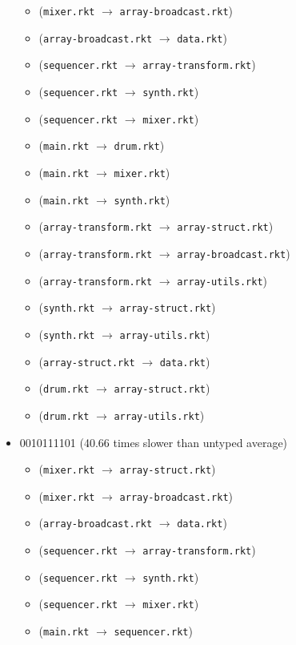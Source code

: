 \documentclass{article}
\newcommand{\mono}[1]{\texttt{#1}}
\begin{document}
\begin{itemize}
\begin{itemize}
  \item (\mono{mixer.rkt} $\rightarrow$ \mono{array-broadcast.rkt})
  \item (\mono{array-broadcast.rkt} $\rightarrow$ \mono{data.rkt})
  \item (\mono{sequencer.rkt} $\rightarrow$ \mono{array-transform.rkt})
  \item (\mono{sequencer.rkt} $\rightarrow$ \mono{synth.rkt})
  \item (\mono{sequencer.rkt} $\rightarrow$ \mono{mixer.rkt})
  \item (\mono{main.rkt} $\rightarrow$ \mono{drum.rkt})
  \item (\mono{main.rkt} $\rightarrow$ \mono{mixer.rkt})
  \item (\mono{main.rkt} $\rightarrow$ \mono{synth.rkt})
  \item (\mono{array-transform.rkt} $\rightarrow$ \mono{array-struct.rkt})
  \item (\mono{array-transform.rkt} $\rightarrow$ \mono{array-broadcast.rkt})
  \item (\mono{array-transform.rkt} $\rightarrow$ \mono{array-utils.rkt})
  \item (\mono{synth.rkt} $\rightarrow$ \mono{array-struct.rkt})
  \item (\mono{synth.rkt} $\rightarrow$ \mono{array-utils.rkt})
  \item (\mono{array-struct.rkt} $\rightarrow$ \mono{data.rkt})
  \item (\mono{drum.rkt} $\rightarrow$ \mono{array-struct.rkt})
  \item (\mono{drum.rkt} $\rightarrow$ \mono{array-utils.rkt})
  \end{itemize}
\item 0010111101 (40.66 times slower than untyped average)
  \begin{itemize}
  \item (\mono{mixer.rkt} $\rightarrow$ \mono{array-struct.rkt})
  \item (\mono{mixer.rkt} $\rightarrow$ \mono{array-broadcast.rkt})
  \item (\mono{array-broadcast.rkt} $\rightarrow$ \mono{data.rkt})
  \item (\mono{sequencer.rkt} $\rightarrow$ \mono{array-transform.rkt})
  \item (\mono{sequencer.rkt} $\rightarrow$ \mono{synth.rkt})
  \item (\mono{sequencer.rkt} $\rightarrow$ \mono{mixer.rkt})
  \item (\mono{main.rkt} $\rightarrow$ \mono{sequencer.rkt})

\end{itemize}
\end{itemize}
\end{document}
